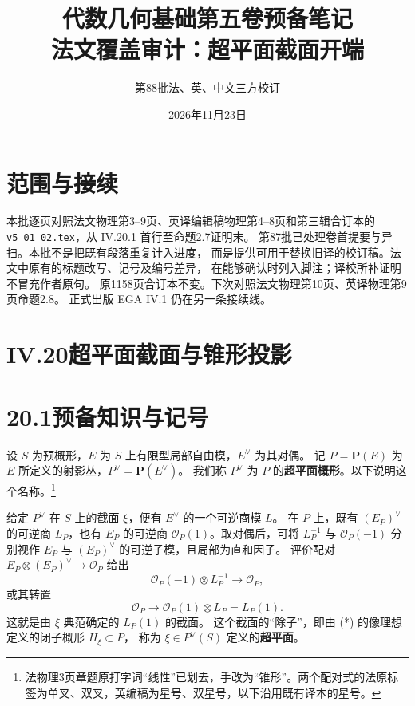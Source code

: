 \documentclass[openany,fontset=fandol]{ctexbook}
\newcommand{\PP}{\mathbf P}
\newcommand{\OO}{\mathcal O}
\begin{document}
\title{代数几何基础第五卷预备笔记\\法文覆盖审计：超平面截面开端}
\author{第88批\quad 法、英、中文三方校订}
\date{2026年11月23日}
\maketitle

\section*{范围与接续}
本批逐页对照法文物理第3--9页、英译编辑稿物理第4--8页和第三辑合订本的
\texttt{v5\_01\_02.tex}，从 IV.20.1 首行至命题2.7证明末。
第87批已处理卷首提要与异扫。本批不是把既有段落重复计入进度，
而是提供可用于替换旧译的校订稿。法文中原有的标题改写、记号及编号差异，
在能够确认时列入脚注；译校所补证明不冒充作者原句。
原1158页合订本不变。下次对照法文物理第10页、英译物理第9页命题2.8。
正式出版 EGA IV.1 仍在另一条接续线。

\section*{IV.20\quad 超平面截面与锥形投影}
\section*{20.1\quad 预备知识与记号}

设 \(S\) 为预概形，\(E\) 为 \(S\) 上有限型局部自由模，\(E^\vee\) 为其对偶。
记 \(P=\PP(E)\) 为 \(E\) 所定义的射影丛，\(P^\vee=\PP(E^\vee)\)。
我们称 \(P^\vee\) 为 \(P\) 的\textbf{超平面概形}。以下说明这个名称。\footnote{法物理3页章题原打字词“线性”已划去，手改为“锥形”。两个配对式的法原标签为单叉、双叉，英编稿为星号、双星号，以下沿用既有译本的星号。}

给定 \(P^\vee\) 在 \(S\) 上的截面 \(\xi\)，便有 \(E^\vee\) 的一个可逆商模 \(L\)。
在 \(P\) 上，既有 \((E_P)^\vee\) 的可逆商 \(L_P\)，也有 \(E_P\) 的可逆商
\(\OO_P(1)\)。取对偶后，可将 \(L_P^{-1}\) 与 \(\OO_P(-1)\) 分别视作
\(E_P\) 与 \((E_P)^\vee\) 的可逆子模，且局部为直和因子。
评价配对 \(E_P\otimes(E_P)^\vee\to\OO_P\) 给出
\begin{equation}
 \OO_P(-1)\otimes L_P^{-1}\longrightarrow\OO_P,\tag{*}
\end{equation}
或其转置
\begin{equation}
 \OO_P\longrightarrow\OO_P(1)\otimes L_P=L_P(1).\tag{**}
\end{equation}
这就是由 \(\xi\) 典范确定的 \(L_P(1)\) 的截面。
这个截面的“除子”，即由 (*) 的像理想定义的闭子概形 \(H_\xi\subset P\)，
称为 \(\xi\in P^\vee(S)\) 定义的\textbf{超平面}。
\end{document}
